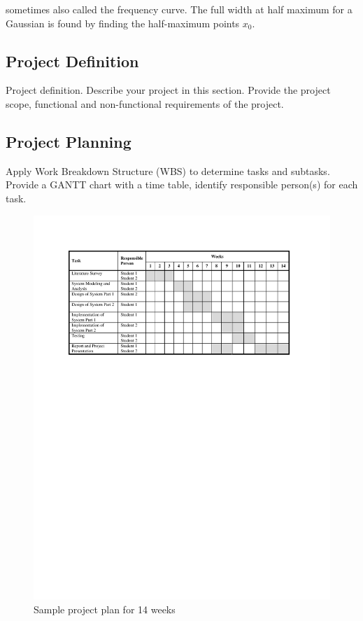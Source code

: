 \documentclass{mefsdp}
\begin{document}
	sometimes also called the frequency curve. The full width at half maximum for a Gaussian is found by finding the half-maximum points $x_0$.
	
	\subsection{Project Definition}
	Project definition. Describe your project in this section. Provide the project scope, functional and non-functional requirements of the project. 
	
	\subsection{Project Planning}
	Apply Work Breakdown Structure (WBS) to determine tasks and subtasks. Provide a GANTT chart with a time table, identify responsible person(s) for each task.   
	
	\begin{figure}[t]
		\centering
		\includegraphics[scale=.85]{../figures/gantt}
		\caption{Sample project plan for 14 weeks}
	\end{figure}
	\newpage
\end{document}
